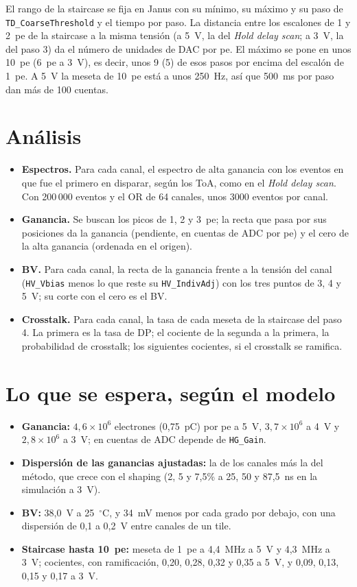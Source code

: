 \documentclass[11pt,a4paper]{article}
\begin{document}
\noindent El rango de la staircase se fija en Janus con su mínimo, su
máximo y su paso de \texttt{TD\_CoarseThreshold} y el tiempo por paso. La
distancia entre los escalones de 1 y 2~pe de la staircase a la misma tensión
(a 5~V, la del \emph{Hold delay scan}; a 3~V, la del paso 3) da el número de
unidades de DAC por pe. El máximo se pone en unos 10~pe (6~pe a 3~V), es
decir, unos 9 (5) de esos pasos por encima del escalón de 1~pe. A 5~V la meseta de 10~pe está a unos 250~Hz, así
que 500~ms por paso dan más de 100 cuentas.

\section{Análisis}
\label{sec:analisis}

\begin{itemize}
\item {\bf Espectros.} Para cada canal, el espectro de alta ganancia con
  los eventos en que fue el primero en disparar, según los ToA, como en el
  \emph{Hold delay scan}. Con 200\,000 eventos y el OR de 64 canales, unos
  3000 eventos por canal.
\item {\bf Ganancia.} Se buscan los picos de 1, 2 y 3~pe; la recta que pasa
  por sus posiciones da la ganancia (pendiente, en cuentas de ADC por pe) y
  el cero de la alta ganancia (ordenada en el origen).
\item {\bf BV.} Para cada canal, la recta de la ganancia frente a la
  tensión del canal (\texttt{HV\_Vbias} menos lo que reste su
  \texttt{HV\_IndivAdj}) con los tres puntos de 3, 4 y 5~V; su corte con el
  cero es el BV.
\item {\bf Crosstalk.} Para cada canal, la tasa de cada meseta de la
  staircase del paso 4. La primera es la tasa de DP; el cociente de la segunda
  a la primera, la probabilidad de crosstalk; los siguientes cocientes,
  si el crosstalk se ramifica.
\end{itemize}

\section{Lo que se espera, según el modelo}

\begin{itemize}
\item {\bf Ganancia:} $4{,}6\times10^6$ electrones (0,75~pC) por pe a 5~V,
  $3{,}7\times10^6$ a 4~V y $2{,}8\times10^6$ a 3~V; en cuentas de ADC
  depende de \texttt{HG\_Gain}.
\item {\bf Dispersión de las ganancias ajustadas:} la de los canales más la
  del método, que crece con el shaping (2, 5 y 7,5\% a 25, 50 y 87,5~ns en
  la simulación a 3~V).
\item {\bf BV:} 38,0~V a 25~$^\circ$C, y 34~mV menos por cada grado por debajo,
  con una dispersión de 0,1 a 0,2~V entre canales de un tile.
\item {\bf Staircase hasta 10~pe:} meseta de 1~pe a 4,4~MHz a 5~V y 4,3~MHz a
  3~V; cocientes, con ramificación, 0,20, 0,28, 0,32 y 0,35 a 5~V, y 0,09,
  0,13, 0,15 y 0,17 a 3~V.
\end{itemize}
\end{document}
